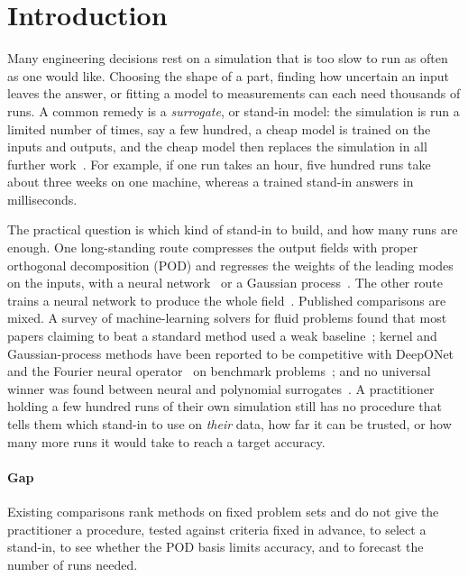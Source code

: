 \section{Introduction}\label{sec:intro}
Many engineering decisions rest on a simulation that is too slow to run as often as one would like. Choosing the shape of a part, finding how uncertain an input leaves the answer, or fitting a model to measurements can each need thousands of runs. A common remedy is a \emph{surrogate}, or stand-in model: the simulation is run a limited number of times, say a few hundred, a cheap model is trained on the inputs and outputs, and the cheap model then replaces the simulation in all further work~\cite{quarteroni2016}. For example, if one run takes an hour, five hundred runs take about three weeks on one machine, whereas a trained stand-in answers in milliseconds.

The practical question is which kind of stand-in to build, and how many runs are enough. One long-standing route compresses the output fields with proper orthogonal decomposition (POD) and regresses the weights of the leading modes on the inputs, with a neural network~\cite{hesthaven2018,bhattacharya2021} or a Gaussian process~\cite{guo2018}. The other route trains a neural network to produce the whole field~\cite{fresca2022,franco2023}. Published comparisons are mixed. A survey of machine-learning solvers for fluid problems found that most papers claiming to beat a standard method used a weak baseline~\cite{mcgreivy2024}; kernel and Gaussian-process methods have been reported to be competitive with DeepONet~\cite{lu2021} and the Fourier neural operator~\cite{li2021} on benchmark problems~\cite{batlle2024}; and no universal winner was found between neural and polynomial surrogates~\cite{westermann2026}. A practitioner holding a few hundred runs of their own simulation still has no procedure that tells them which stand-in to use on \emph{their} data, how far it can be trusted, or how many more runs it would take to reach a target accuracy.

\paragraph{Gap} Existing comparisons rank methods on fixed problem sets and do not give the practitioner a procedure, tested against criteria fixed in advance, to select a stand-in, to see whether the POD basis limits accuracy, and to forecast the number of runs needed.

